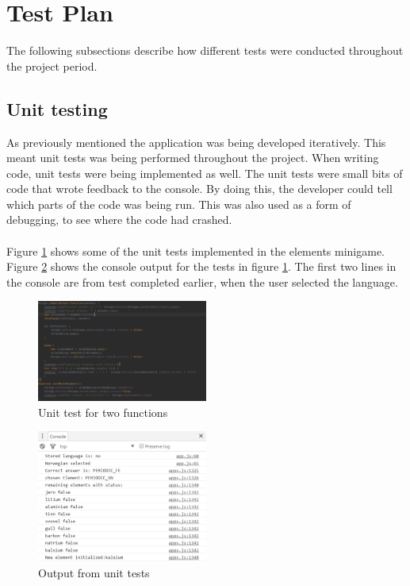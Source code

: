 \section{Test Plan}
The following subsections describe how different tests were conducted throughout the project period.

\subsection{Unit testing}
As previously mentioned the application was being developed iteratively. This meant unit tests was being performed throughout the project. When writing code, unit tests were being implemented as well. The unit tests were small bits of code that wrote feedback to the console. By doing this, the developer could tell which parts of the code was being run. This was also used as a form of debugging, to see where the code had crashed.\\\\
Figure \ref{fig:unit_test} shows some of the unit tests implemented in the elements minigame. Figure \ref{fig:console_output} shows the console output for the tests in figure \ref{fig:unit_test}. The first two lines in the console are from test completed earlier, when the user selected the language.

\begin{figure}[H]
\centering
    \includegraphics[width=0.5\textwidth]{images/Unit_tests.PNG}
    \caption{Unit test for two functions}
    \label{fig:unit_test}
    
\end{figure}

\begin{figure}[H]
\centering
    \includegraphics[width=0.5\textwidth]{images/Console_output.PNG}
    \caption{Output from unit tests}
    \label{fig:console_output}
    
\end{figure}

